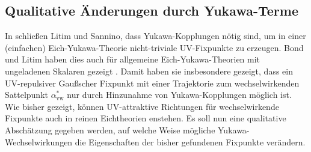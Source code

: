     
  \subsection{Qualitative Änderungen durch Yukawa-Terme}
    
    In \cite{Asymptotic_safety_guaranteed} schließen Litim und Sannino, dass 
    Yukawa-Kopplungen nötig sind, um in einer (einfachen) Eich-Yukawa-Theorie 
    nicht-triviale UV-Fixpunkte zu erzeugen. Bond und Litim haben 
    dies auch für allgemeine Eich-Yukawa-Theorien mit 
    ungeladenen Skalaren gezeigt \cite{Bond_Litim}. Damit haben sie 
    insbesondere gezeigt, dass ein UV-repulsiver Gaußscher Fixpunkt mit 
    einer Trajektorie zum wechselwirkenden Sattelpunkt $\alpha^{*}_\text{vw}$ nur durch 
    Hinzunahme von Yukawa-Kopplungen möglich ist. Wie bisher gezeigt, können 
    UV-attraktive Richtungen für wechselwirkende Fixpunkte auch in 
    reinen Eichtheorien enstehen. Es soll nun eine qualitative Abschätzung 
    gegeben werden, auf welche Weise mögliche Yukawa-Wechselwirkungen die 
    Eigenschaften der bisher gefundenen Fixpunkte verändern.
    
